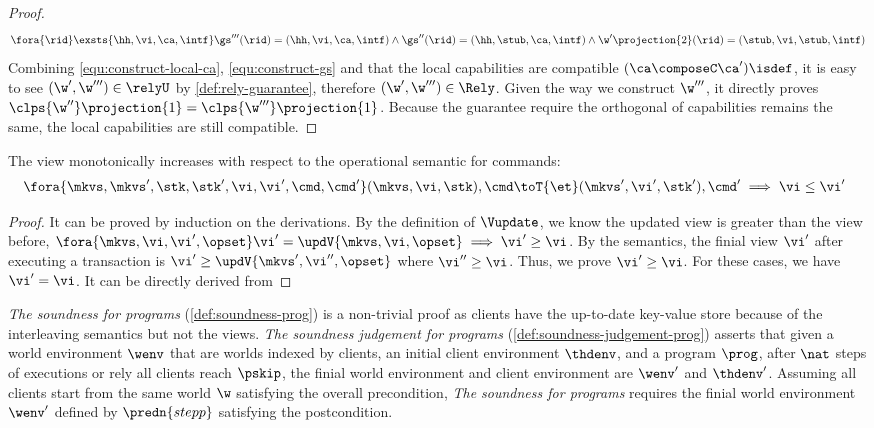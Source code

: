 \begin{proof}
\begin{equation}
\label{equ:construct-gs}
    \fora{\rid} \exsts{\hh,\vi,\ca,\intf} \gs'''(\rid) = (\hh, \vi, \ca, \intf) \land \gs''(\rid) = (\hh, \stub, \ca, \intf) \land \w'\projection{2}(\rid) = (\stub, \vi, \stub, \intf)
\end{equation}
Combining \cref{equ:construct-local-ca}, \cref{equ:construct-gs} and that the local capabilities are compatible \( ( \ca \composeC \ca' )\isdef \), it is easy to see \( ( \w', \w''' ) \in \relyU \) by \cref{def:rely-guarantee}, therefore \( ( \w', \w''' ) \in \Rely \).
Given the way we construct \( \w''' \), it directly proves \( \clps{\w''}\projection{1} = \clps{\w'''}\projection{1} \).
Because the guarantee require the orthogonal of capabilities remains the same, the local capabilities are still compatible.
\end{proof}

\begin{lemma}
\label{lem:mono-view}
The view monotonically increases with respect to the operational semantic for commands:
\[
    \begin{array}{@{}l}
        \fora{\mkvs, \mkvs', \stk, \stk', \vi, \vi', \cmd, \cmd'} (\mkvs, \vi, \stk), \cmd \toT{\et} (\mkvs', \vi', \stk'), \cmd' \implies \vi \leq \vi'
    \end{array}
\]
\end{lemma}
\begin{proof}
    It can be proved by induction on the derivations.
    By the definition of \( \Vupdate \), we know the updated view is greater than the view before, \ie \( \fora{\mkvs, \vi, \vi', \opset} \vi' = \updV{\mkvs, \vi, \opset} \implies \vi' \geq \vi\).
    By the semantics, the finial view \( \vi' \) after executing a transaction is \( \vi' \geq \updV{\mkvs', \vi'', \opset} \) where \( \vi'' \geq \vi\).
    Thus, we prove \( \vi' \geq \vi \).
    For these cases, we have \( \vi' = \vi\).
    It can be directly derived from \ih
\end{proof}


\emph{The soundness for programs} (\cref{def:soundness-prog}) is a non-trivial proof as clients have the up-to-date key-value store because of the interleaving semantics but not the views.
\emph{The soundness judgement for programs} (\cref{def:soundness-judgement-prog}) asserts that given a world environment \( \wenv \) that are worlds indexed by clients, an initial client environment \( \thdenv \), and a program \( \prog\), after \( \nat \)  steps of executions or rely all clients reach \( \pskip \), the finial world environment and client environment are \( \wenv' \) and \( \thdenv' \).
Assuming all clients start from the same world \( \w \) satisfying the overall precondition, \emph{The soundness for programs} requires the finial world environment \( \wenv' \) defined by \( \predn{stepp} \) satisfying the postcondition.

